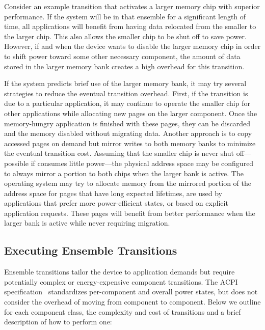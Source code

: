 Consider an example transition that activates a larger memory chip with
superior performance. If the system will be in that ensemble for a
significant length of time, all applications will benefit from having data
relocated from the smaller to the larger chip. This also allows the smaller
chip to be shut off to save power. However, if and when the device wants to
disable the larger memory chip in order to shift power toward some other
necessary component, the amount of data stored in the larger memory bank
creates a high overhead for this transition.

If the system predicts brief use of the larger memory bank, it may try
several strategies to reduce the eventual transition overhead. First, if the
transition is due to a particular application, it may continue to operate the
smaller chip for other applications while allocating new pages on the larger
component. Once the memory-hungry application is finished with these pages,
they can be discarded and the memory disabled without migrating data. Another
approach is to copy accessed pages on demand but mirror writes to both memory
banks to minimize the eventual transition cost. Assuming that the smaller
chip is never shut off---possible if consumes little power---the physical
address space may be configured to always mirror a portion to both chips when
the larger bank is active. The operating system may try to allocate memory
from the mirrored portion of the address space for pages that have long
expected lifetimes, are used by applications that prefer more power-efficient
states, or based on explicit application requests. These pages will benefit
from better performance when the larger bank is active while never requiring
migration.

\subsection{Executing Ensemble Transitions}
\label{subsec-execute}

Ensemble transitions tailor the device to application demands but require
potentially complex or energy-expensive component transitions. The ACPI
specification~\cite{acpi-standard} standardizes per-component and overall
power states, but does not consider the overhead of moving from component to
component. Below we outline for each component class, the complexity and cost
of transitions and a brief description of how to perform one:

